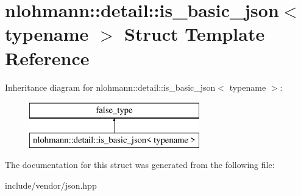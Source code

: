 \hypertarget{structnlohmann_1_1detail_1_1is__basic__json}{}\section{nlohmann\+:\+:detail\+:\+:is\+\_\+basic\+\_\+json$<$ typename $>$ Struct Template Reference}
\label{structnlohmann_1_1detail_1_1is__basic__json}
Inheritance diagram for nlohmann\+:\+:detail\+:\+:is\+\_\+basic\+\_\+json$<$ typename $>$\+:\begin{figure}[H]
\begin{center}
\leavevmode
\includegraphics[height=2.000000cm]{d4/df6/structnlohmann_1_1detail_1_1is__basic__json}
\end{center}
\end{figure}


The documentation for this struct was generated from the following file\+:\begin{DoxyCompactItemize}
\item 
include/vendor/json.\+hpp\end{DoxyCompactItemize}
